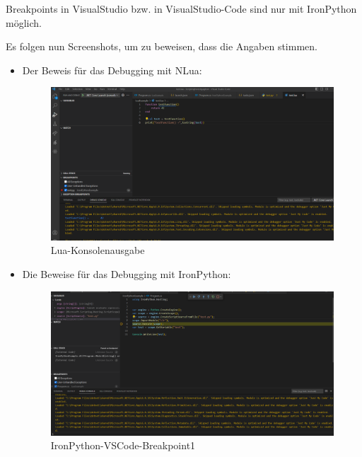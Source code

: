 Breakpoints in VisualStudio bzw. in VisualStudio-Code sind nur mit IronPython möglich.


Es folgen nun Screenshots, um zu beweisen, dass die Angaben stimmen.

\begin{itemize}
    \item Der Beweis für das Debugging mit NLua:
    
    \begin{figure}[H]
        \centering
        \includegraphics[scale=0.5]{pics/Lua-Konsolenausgabe.png}
        \caption{Lua-Konsolenausgabe}
        \label{fig:impl:KonsolenausgabeLua}
    \end{figure}

\newpage
    \item Die Beweise für das Debugging mit IronPython:
    \begin{figure}[H]
        \centering
        \includegraphics[scale=0.5]{pics/IronPythonVSCodeBreakpoint1.png}
        \caption{IronPython-VSCode-Breakpoint1}
        \label{fig:impl:IronPythonVSCodeBreakpoint1}
    \end{figure}


\end{itemize}
